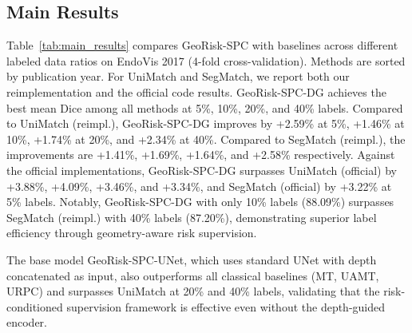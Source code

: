 \documentclass[conference]{IEEEtran}
\begin{document}
\subsection{Main Results}

Table~\ref{tab:main_results} compares GeoRisk-SPC with baselines across different labeled data ratios on EndoVis 2017 (4-fold cross-validation). Methods are sorted by publication year. For UniMatch and SegMatch, we report both our reimplementation and the official code results. GeoRisk-SPC-DG achieves the best mean Dice among all methods at 5\%, 10\%, 20\%, and 40\% labels. Compared to UniMatch (reimpl.), GeoRisk-SPC-DG improves by +2.59\% at 5\%, +1.46\% at 10\%, +1.74\% at 20\%, and +2.34\% at 40\%. Compared to SegMatch (reimpl.), the improvements are +1.41\%, +1.69\%, +1.64\%, and +2.58\% respectively. Against the official implementations, GeoRisk-SPC-DG surpasses UniMatch (official) by +3.88\%, +4.09\%, +3.46\%, and +3.34\%, and SegMatch (official) by +3.22\% at 5\% labels. Notably, GeoRisk-SPC-DG with only 10\% labels (88.09\%) surpasses SegMatch (reimpl.) with 40\% labels (87.20\%), demonstrating superior label efficiency through geometry-aware risk supervision.

The base model GeoRisk-SPC-UNet, which uses standard UNet with depth concatenated as input, also outperforms all classical baselines (MT, UAMT, URPC) and surpasses UniMatch at 20\% and 40\% labels, validating that the risk-conditioned supervision framework is effective even without the depth-guided encoder.
\end{document}
